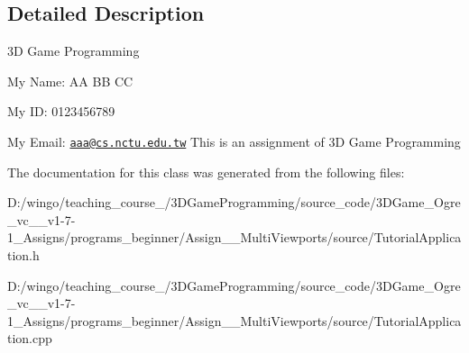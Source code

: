\subsection{Detailed Description}
3D Game Programming \par
 My Name: AA BB CC \par
 My ID: 0123456789 \par
 My Email: \href{mailto:aaa@cs.nctu.edu.tw}{\tt aaa@cs.nctu.edu.tw} This is an assignment of 3D Game Programming 

The documentation for this class was generated from the following files:\begin{DoxyCompactItemize}
\item 
D:/wingo/teaching\_\-course\_/3DGameProgramming/source\_\-code/3DGame\_\-Ogre\_\-vc\_\_\-v1-\/7-\/1\_\-Assigns/programs\_\-beginner/Assign\_\_\-MultiViewports/source/TutorialApplication.h\item 
D:/wingo/teaching\_\-course\_/3DGameProgramming/source\_\-code/3DGame\_\-Ogre\_\-vc\_\_\-v1-\/7-\/1\_\-Assigns/programs\_\-beginner/Assign\_\_\-MultiViewports/source/TutorialApplication.cpp\end{DoxyCompactItemize}
